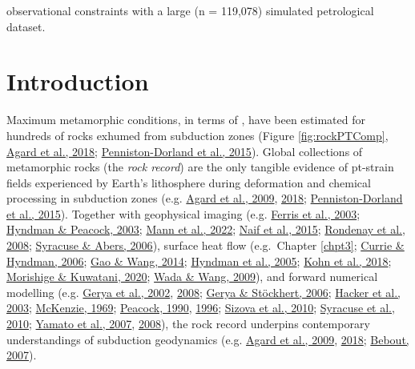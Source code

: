observational constraints with a large (n = 119,078) simulated petrological dataset.

\hypertarget{chpt4Intro}{%
\section{Introduction}\label{chpt4Intro}}

Maximum metamorphic conditions, in terms of , have been estimated for hundreds of  rocks exhumed from subduction zones (Figure \ref{fig:rockPTComp}, \protect\hyperlink{ref-agard2018}{Agard et al., 2018}; \protect\hyperlink{ref-penniston2015}{Penniston-Dorland et al., 2015}). Global collections of metamorphic rocks (the \emph{rock record}) are the only tangible evidence of \gls{pt}-strain fields experienced by Earth's lithosphere during deformation and chemical processing in subduction zones (e.g. \protect\hyperlink{ref-agard2009}{Agard et al., 2009}, \protect\hyperlink{ref-agard2018}{2018}; \protect\hyperlink{ref-penniston2015}{Penniston-Dorland et al., 2015}). Together with geophysical imaging (e.g. \protect\hyperlink{ref-ferris2003}{Ferris et al., 2003}; \protect\hyperlink{ref-hyndman2003}{Hyndman \& Peacock, 2003}; \protect\hyperlink{ref-mann2022}{Mann et al., 2022}; \protect\hyperlink{ref-naif2015}{Naif et al., 2015}; \protect\hyperlink{ref-rondenay2008}{Rondenay et al., 2008}; \protect\hyperlink{ref-syracuse2006}{Syracuse \& Abers, 2006}), surface heat flow (e.g.~Chapter \ref{chpt3}; \protect\hyperlink{ref-currie2006}{Currie \& Hyndman, 2006}; \protect\hyperlink{ref-gao2014}{Gao \& Wang, 2014}; \protect\hyperlink{ref-hyndman2005}{Hyndman et al., 2005}; \protect\hyperlink{ref-kohn2018}{Kohn et al., 2018}; \protect\hyperlink{ref-morishige2020}{Morishige \& Kuwatani, 2020}; \protect\hyperlink{ref-wada2009}{Wada \& Wang, 2009}), and forward numerical modelling (e.g. \protect\hyperlink{ref-gerya2002}{Gerya et al., 2002}, \protect\hyperlink{ref-gerya2008}{2008}; \protect\hyperlink{ref-gerya2006}{Gerya \& Stöckhert, 2006}; \protect\hyperlink{ref-hacker2003}{Hacker et al., 2003}; \protect\hyperlink{ref-mckenzie1969}{McKenzie, 1969}; \protect\hyperlink{ref-peacock1990}{Peacock, 1990}, \protect\hyperlink{ref-peacock1996}{1996}; \protect\hyperlink{ref-sizova2010}{Sizova et al., 2010}; \protect\hyperlink{ref-syracuse2010}{Syracuse et al., 2010}; \protect\hyperlink{ref-yamato2007}{Yamato et al., 2007}, \protect\hyperlink{ref-yamato2008}{2008}), the rock record underpins contemporary understandings of subduction geodynamics (e.g. \protect\hyperlink{ref-agard2009}{Agard et al., 2009}, \protect\hyperlink{ref-agard2018}{2018}; \protect\hyperlink{ref-bebout2007}{Bebout, 2007}).



